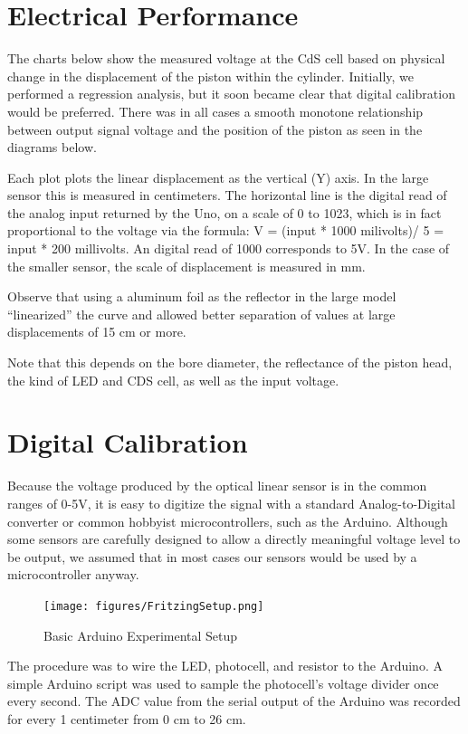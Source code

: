 \documentclass[10pt,conference,compsocconf]{IEEEtran}
\begin{document}
\section{Electrical Performance}

The charts below show the measured voltage at the CdS cell based on
physical change in the displacement of the piston within the
cylinder. Initially, we performed a regression analysis, but it soon
became clear that digital calibration would be preferred. There was in
all cases a smooth monotone relationship between output signal voltage
and the position of the piston as seen in the diagrams below.

Each plot plots the linear displacement as the vertical (Y) axis. In
the large sensor this is measured in centimeters. The horizontal line
is the digital read of the analog input returned by the Uno, on a
scale of 0 to 1023, which is in fact proportional to the voltage via
the formula: V = (input * 1000 milivolts)/ 5 = input * 200
millivolts. An digital read of 1000 corresponds to 5V. In the case of
the smaller sensor, the scale of displacement is measured in mm.

Observe that using a aluminum foil as the reflector in the large model
“linearized” the curve and allowed better separation of values at
large displacements of 15 cm or more.

Note that this depends on the bore diameter, the reflectance of the
piston head, the kind of LED and CDS cell, as well as the input
voltage.

\section{Digital Calibration}


Because the voltage produced by the optical linear sensor is in the
common ranges of 0-5V, it is easy to digitize the signal with a
standard Analog-to-Digital converter or common hobbyist
microcontrollers, such as the Arduino. Although some sensors are
carefully designed to allow a directly meaningful voltage level to be
output, we assumed that in most cases our sensors would be used by a
microcontroller anyway.


\begin{figure}
  \centering
  \texttt{[image: figures/FritzingSetup.png]}
  \caption{Basic Arduino Experimental Setup}  
\end{figure}


The procedure was to wire the LED, photocell, and resistor to the
Arduino. A simple Arduino script was used to sample the photocell’s
voltage divider once every second. The ADC value from the serial
output of the Arduino was recorded for every 1 centimeter from 0 cm to
26 cm.
\end{document}
